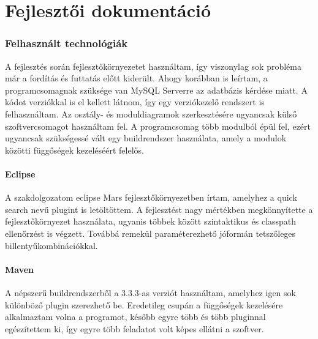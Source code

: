 \part{Fejlesztői dokumentáció}

\section{Felhasznált technológiák}
A fejlesztés során fejlesztőkörnyezetet használtam, így viszonylag sok probléma már a fordítás és futtatás előtt kiderült. Ahogy korábban is leírtam, a programcsomagnak szüksége van MySQL Serverre az adatbázis kérdése miatt. A kódot verziókkal is el kellett látnom, így egy verziókezelő rendszert is felhasználtam. Az osztály- és moduldiagramok szerkesztésére ugyancsak külső szoftvercsomagot használtam fel. A programcsomag több modulból épül fel, ezért ugyancsak szükségessé vált egy buildrendszer használata, amely a modulok közötti függőségek kezeléséért felelős.

\subsection{Eclipse}
A szakdolgozatom eclipse Mars \cite{eclipse_mars} fejlesztőkörnyezetben írtam, amelyhez a quick search \cite{quick_search} nevű plugint is letöltöttem. A fejlesztést nagy mértékben megkönnyítette a fejlesztőkörnyezet használata, ugyanis többek között szintaktikus és classpath ellenőrzést is végzett. Továbbá remekül paraméterezhető jóformán tetszőleges billentyűkombinációkkal.

\subsection{Maven}
A népszerű buildrendszerből a 3.3.3-as verziót használtam, amelyhez igen sok különböző plugin szerezhető be. Eredetileg csupán a függőségek kezelésére alkalmaztam volna a programot, később egyre több és több pluginnal egészítettem ki, így egyre több feladatot volt képes ellátni a szoftver.

